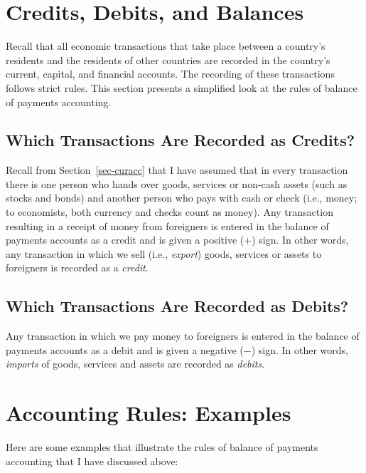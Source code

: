 \documentclass[
  letterpaper,
]{book}
\theoremstyle{plain}
\theoremstyle{remark}
\begin{document}
\section{Credits, Debits, and
Balances}\label{sec-credits-debits-balances}

Recall that all economic transactions that take place between a
country's residents and the residents of other countries are recorded in
the country's current, capital, and financial accounts. The recording of
these transactions follows strict rules. This section presents a
simplified look at the rules of balance of payments accounting.

\subsection{Which Transactions Are Recorded as
Credits?}\label{sec-credits}

Recall from Section~\ref{sec-curacc} that I have assumed that in every
transaction there is one person who hands over goods, services or
non-cash assets (such as stocks and bonds) and another person who pays
with cash or check (i.e., money; to economists, both currency and checks
count as money). Any transaction resulting in a receipt of money from
foreigners is entered in the balance of payments accounts as a
credit and is given a positive
(\(+\)) sign. In other words, any transaction in which we sell (i.e.,
\emph{export}) goods, services or assets to foreigners is recorded as a
\emph{credit}.

\subsection{Which Transactions Are Recorded as
Debits?}\label{sec-debits}

Any transaction in which we pay money to foreigners is entered in the
balance of payments accounts as a
debit and is given a negative (\(-\))
sign. In other words, \emph{imports} of goods, services and assets are
recorded as \emph{debits}.

\section{Accounting Rules: Examples}\label{sec-accex}

Here are some examples that illustrate the rules of balance of payments
accounting that I have discussed above:
\end{document}
